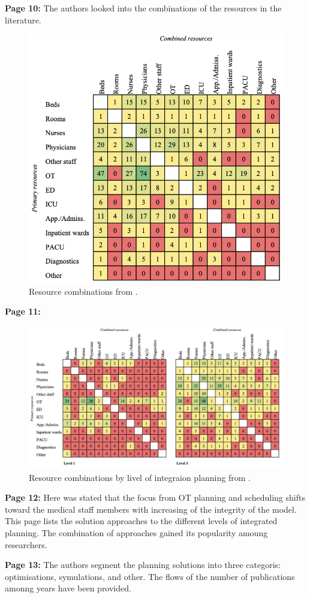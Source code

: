     \textbf{Page 10:}
    The authors looked into the combinations of the resources in the literature.
    \begin{figure}[H]
        \centering
        \includegraphics[width=.5\textwidth]{figures/SR0010NL23/fig4.png}
        \caption{Resource combinations from \cite{x338}.}
        \label{fig4:SR0010NL23}
    \end{figure}

    \textbf{Page 11:}
    \begin{figure}[H]
        \centering
        \includegraphics[width=1\textwidth]{figures/SR0010NL23/fig5.png}
        \caption{Resource combinations by livel of integraion planning from \cite{x338}.}
        \label{fig5:SR0010NL23}
    \end{figure}
    
    \textbf{Page 12:}
    Here was stated that the focus from OT planning and scheduling shifts toward the medical staff members with increasing of the integrity of the model. This page lists the solution approaches to the different levels of integrated planning. The combination of approaches gained its popularity amoung researchers.
    
    \textbf{Page 13:}
    The authors segment the planning solutions into three categoris: optimisations, symulations, and other. The flows of the number of publications amonng years have been provided.

